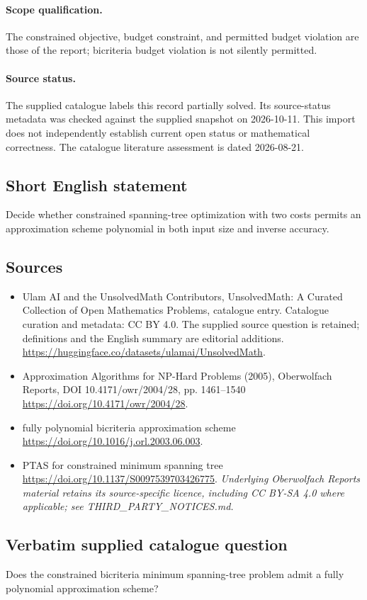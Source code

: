 \documentclass[11pt]{article}
\begin{document}
\paragraph{Scope qualification.}
The constrained objective, budget constraint, and permitted budget violation are those of the report; bicriteria budget violation is not silently permitted.
\paragraph{Source status.}
The supplied catalogue labels this record partially solved. Its source-status metadata was checked against the supplied snapshot on 2026-10-11. This import does not independently establish current open status or mathematical correctness. The catalogue literature assessment is dated 2026-08-21.
\subsection{Short English statement}
Decide whether constrained spanning-tree optimization with two costs permits an approximation scheme polynomial in both input size and inverse accuracy.
\subsection{Sources}
\begin{itemize}
\item[S1] Ulam AI and the UnsolvedMath Contributors, UnsolvedMath: A Curated Collection of Open Mathematics Problems, catalogue entry. Catalogue curation and metadata: CC BY 4.0. The supplied source question is retained; definitions and the English summary are editorial additions.
\url{https://huggingface.co/datasets/ulamai/UnsolvedMath}.
\item[S2] Approximation Algorithms for NP-Hard Problems (2005), Oberwolfach Reports, DOI 10.4171/owr/2004/28, pp. 1461--1540
\url{https://doi.org/10.4171/owr/2004/28}.
\item[S3] fully polynomial bicriteria approximation scheme
\url{https://doi.org/10.1016/j.orl.2003.06.003}.
\item[S4] PTAS for constrained minimum spanning tree
\url{https://doi.org/10.1137/S0097539703426775}.
\textit{Underlying Oberwolfach Reports material retains its source-specific licence, including CC BY-SA 4.0 where applicable; see THIRD\_PARTY\_NOTICES.md.}
\end{itemize}
\subsection{Verbatim supplied catalogue question}
Does the constrained bicriteria minimum spanning-tree problem admit a fully polynomial approximation scheme?
\end{document}
